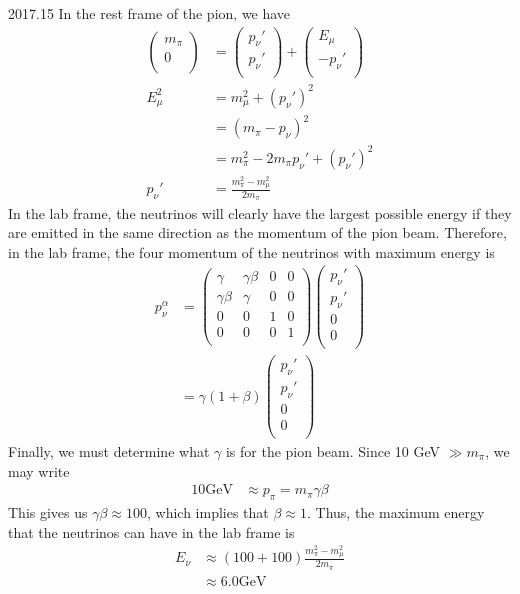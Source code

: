 \documentclass[12pt]{article}
\begin{document}
\begin{solution}{2017.15}
In the rest frame of the pion, we have
\begin{align*}
\left( \begin{array}{c}
m_\pi \\
0 \\
\end{array} \right) & = \left( \begin{array}{c}
p_\nu' \\
p_\nu' \\
\end{array} \right) + \left( \begin{array}{c}
E_\mu \\
-p_\nu' \\
\end{array} \right) \\
E_\mu^2 & = m_\mu^2 + (p_\nu')^2 \\
& = (m_\pi - p_\nu)^2 \\
& = m_\pi^2 - 2m_\pi p_\nu' + (p_\nu')^2 \\
p_\nu' & = \frac{m_\pi^2 - m_\mu^2}{2m_\pi}
\end{align*}
In the lab frame, the neutrinos will clearly have the largest possible energy if they are emitted in the same direction as the momentum of the pion beam.
Therefore, in the lab frame, the four momentum of the neutrinos with maximum energy is
\begin{align*}
p_\nu^\alpha & = \left( \begin{array}{cccc}
\gamma & \gamma \beta & 0 & 0 \\
\gamma \beta & \gamma & 0 & 0 \\
0 & 0 & 1 & 0 \\
0 & 0 & 0 & 1 \\
\end{array} \right) \left( \begin{array}{c}
p_\nu' \\
p_\nu' \\
0 \\
0 \\
\end{array} \right) \\
& = \gamma (1 + \beta) \left( \begin{array}{c}
p_\nu' \\
p_\nu' \\
0 \\
0 \\
\end{array} \right)
\end{align*}
Finally, we must determine what $\gamma$ is for the pion beam.
Since 10 GeV $\gg m_\pi$, we may write
\begin{align*}
10 \mathrm{GeV} & \approx p_\pi = m_\pi \gamma \beta
\end{align*}
This gives us $\gamma \beta \approx 100$, which implies that $\beta \approx 1$.
Thus, the maximum energy that the neutrinos can have in the lab frame is
\begin{align*}
E_\nu & \approx (100 + 100) \frac{m_\pi^2 - m_\mu^2}{2m_\pi} \\
& \approx 6.0 \mathrm{GeV}
\end{align*}


\end{solution}
\end{document}
